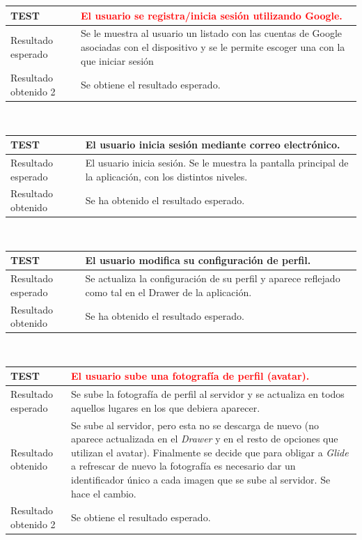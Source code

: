 \documentclass[twoside]{report}
\newcommand\addrow[2]{#1 &#2\\ }
\newcommand\addheading[2]{#1 &#2\\ \hline}
\newcommand\tabularhead{\begin{tabular}{lp{0.7\textwidth}}
\hline
}
\newenvironment{test}{\tabularhead}
{\hline\end{tabular}}
\begin{document}
\vspace{0.5cm}

\begin{test}
  \addheading{\textbf{TEST\arabic{test}}}{\textcolor{red}{El usuario se registra/inicia sesión utilizando Google.}} 
  \addrow{Resultado esperado}{Se le muestra al usuario un listado con las cuentas de Google asociadas con el dispositivo y se le permite escoger una con la que iniciar sesión}
   \addrow{Resultado obtenido 2}{Se obtiene el resultado esperado.}
\end{test}\\

\vspace{0.5cm}

\begin{test}
  \addheading{\textbf{TEST\arabic{test}}}{El usuario inicia sesión mediante correo electrónico.} 
  \addrow{Resultado esperado}{El usuario inicia sesión. Se le muestra la pantalla principal de la aplicación, con los distintos niveles.}
  \addrow{Resultado obtenido}{Se ha obtenido el resultado esperado.}
\end{test}\\

\vspace{0.5cm}

\begin{test}
  \addheading{\textbf{TEST\arabic{test}}}{El usuario modifica su configuración de perfil.} 
  \addrow{Resultado esperado}{Se actualiza la configuración de su perfil y aparece reflejado como tal en el Drawer de la aplicación.}
  \addrow{Resultado obtenido}{Se ha obtenido el resultado esperado.}
\end{test}\\

\vspace{0.5cm}

\begin{test}
  \addheading{\textbf{TEST\arabic{test}}}{\textcolor{red}{El usuario sube una fotografía de perfil (avatar).}} 
  \addrow{Resultado esperado}{Se sube la fotografía de perfil al servidor y se actualiza en todos aquellos lugares en los que debiera aparecer.}
  \addrow{Resultado obtenido}{Se sube al servidor, pero esta no se descarga de nuevo (no aparece actualizada en el \textit{Drawer} y en el resto de opciones que utilizan el avatar). Finalmente se decide que para obligar a \textit{Glide} a refrescar de nuevo la fotografía es necesario dar un identificador único a cada imagen que se sube al servidor. Se hace el cambio.}
   \addrow{Resultado obtenido 2}{Se obtiene el resultado esperado.}
\end{test}\\
\end{document}
